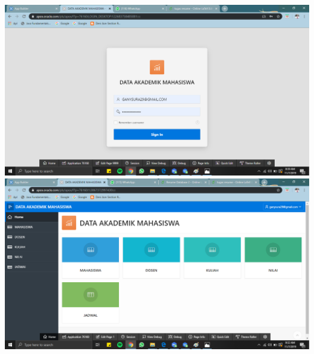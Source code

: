 \documentclass{article}
\begin{document}
\begin{enumerate}
    \begin{center}
    \includegraphics[width=.6\textwidth]{gambar/46.png}
    \includegraphics[width=.6\textwidth]{gambar/45.png}
    \end{center}
\end{enumerate}
\end{document}
